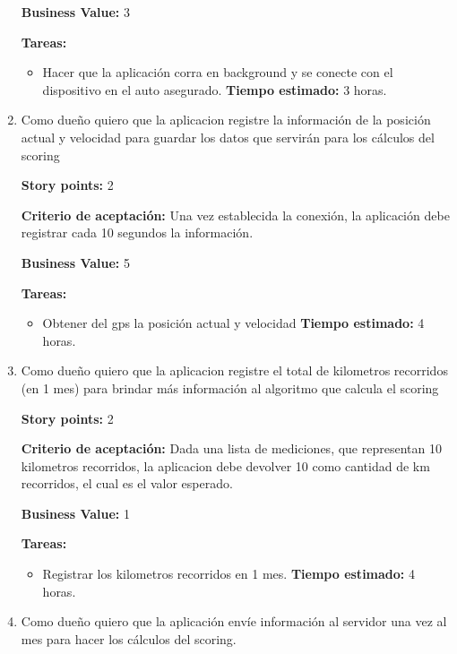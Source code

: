 \begin{enumerate}
\textbf{Business Value:} 3

\textbf{Tareas:}
	\begin{itemize}
		\item Hacer que la aplicación corra en background y se conecte con el dispositivo en el auto asegurado.
		\newline \textbf{Tiempo estimado:} 3 horas.
	\end{itemize}





\item Como dueño quiero que la aplicacion registre la información de la posición actual y velocidad para guardar los datos que servirán para los cálculos del scoring

\textbf{Story points:} 2

\textbf{Criterio de aceptación:}
Una vez establecida la conexión, la aplicación debe registrar cada 10 segundos la información.

\textbf{Business Value:} 5

\textbf{Tareas:}
	\begin{itemize}
		\item Obtener del gps la posición actual y velocidad
		\newline \textbf{Tiempo estimado:} 4 horas.
	\end{itemize}





\item Como dueño quiero que la aplicacion registre el total de kilometros recorridos (en 1 mes) para brindar más información al algoritmo que calcula el scoring

\textbf{Story points:} 2

\textbf{Criterio de aceptación:}
Dada una lista de mediciones, que representan 10 kilometros recorridos, la aplicacion debe devolver 10 como cantidad de km recorridos, el cual es el valor esperado.

\textbf{Business Value:} 1

\textbf{Tareas:}
	\begin{itemize}
		\item Registrar los kilometros recorridos en 1 mes.
		\newline \textbf{Tiempo estimado:} 4 horas. 
	\end{itemize}






\item Como dueño quiero que la aplicación envíe información al servidor una vez al mes para hacer los cálculos del scoring.


\end{enumerate}

